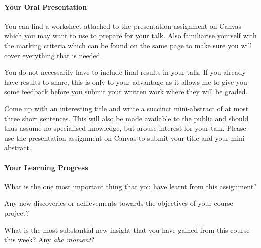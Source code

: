 \newpage
\paragraph*{Your Oral Presentation}

You can find a worksheet attached to the presentation assignment on \textsf{Canvas} which you may want to use to prepare for your talk. Also familiarise yourself with the marking criteria which can be found on the same page to make sure you will cover everything that is needed.

You do not necessarily have to include final results in your talk. If you already have results to share, this is only to your advantage as it allows me to give you some feedback before you submit your written work where they will be graded.

Come up with an interesting title and write a succinct mini-abstract of at most three short sentences. This will also be made available to the public and should thus assume no specialised knowledge, but arouse interest for your talk. Please use the presentation assignment on \textsf{Canvas} to submit your title and your mini-abstract.

\paragraph*{Your Learning Progress}%

What is the one most important thing that you have learnt from this assignment?

\vspace*{3mm}
\hrulefill

\vspace*{3mm}
\hrulefill

Any new discoveries or achievements towards the objectives of your course project?

\vspace*{3mm}
\hrulefill

\vspace*{3mm}
\hrulefill

What is the most substantial new insight that you have gained from this course this week? Any \emph{aha moment}?

\vspace*{3mm}
\hrulefill

\vspace*{3mm}
\hrulefill


